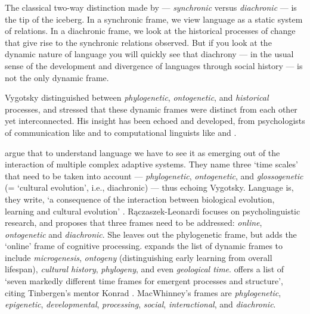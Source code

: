 The classical two-way distinction made by \citet{saussure_cours_1916} --- \textit{synchronic} versus \textit{diachronic} --- is the tip of the iceberg. In a synchronic frame, we view language as a static 
system of relations. In a diachronic frame, we look at the historical processes of change that give rise to the synchronic relations observed. But if you look at the dynamic nature of language you will quickly see that 
diachrony --- in the usual sense of the development and 
divergence of languages through social history --- is not the only dynamic frame. 



Vygotsky distinguished between \textit{phylogenetic}, \textit{ontogenetic}, and \textit{historical} processes, and stressed that 
these dynamic frames were distinct from each other yet interconnected. 
His insight has been echoed and developed, from 
psychologists of communication like \citet{tomasello_cultural_1999} and \citet{cole_phylogeny_2007} to computational linguists like \citet{steels_synthesizing_1998,steels_evolving_2003} and \citet{smith_complex_2003}. 



\citet[540]{smith_complex_2003} argue that to understand language we have to see it 
as emerging out of the interaction of multiple complex adaptive systems. They name three \textquoteleft time scales' that need to be taken into account --- \textit{phylogenetic}, \textit{ontogenetic}, and \textit{glossogenetic} 
(= \textquoteleft cultural evolution', i.e., diachronic) --- thus echoing 
Vygotsky. Language is, they write, \textquoteleft a consequence of the interaction 
between biological evolution, learning and cultural evolution' \citep[541]{smith_complex_2003}. R\k{a}czaszek-Leonardi focuses on psycholinguistic research, and proposes that three frames need to be addressed: \textit{online}, \textit{ontogenetic} and \textit{diachronic}. She leaves out the phylogenetic frame, but adds the \textquoteleft online' frame 
of cognitive processing. \citet[185]{cole_cultural_1996} expands the list of dynamic frames to include \textit{microgenesis}, \textit{ontogeny} (distinguishing early learning from 
overall lifespan), \textit{cultural history}, \textit{phylogeny}, 
and even \textit{geological time}. \citet[193ff]{macwhinney_emergence_2005} offers a list of \textquoteleft seven markedly different 
time frames for emergent processes and structure', citing Tinbergen's 
mentor Konrad \citet{lorenz_evolution_1958}. MacWhinney's frames are \textit{phylogenetic}, \textit{epigenetic}, \textit{developmental}, 
\textit{processing}, \textit{social}, \textit{interactional}, 
and \textit{diachronic}. 



